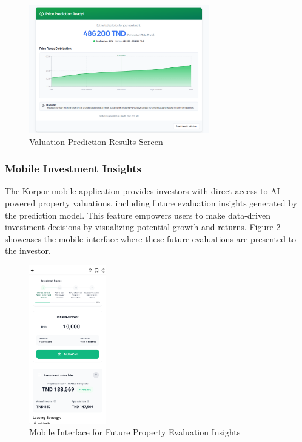 \newpage
\begin{figure}[htbp]
        \centering
        \includegraphics[width=0.7\textwidth]{images/screenshot_predctionscreen.png}
        \caption{Valuation Prediction Results Screen}
        \label{fig:prediction-results}
\end{figure}

\subsubsection{Mobile Investment Insights}
The Korpor mobile application provides investors with direct access to AI-powered property valuations, including future evaluation insights generated by the prediction model. This feature empowers users to make data-driven investment decisions by visualizing potential growth and returns. Figure \ref{fig:mobile-future-evaluation} showcases the mobile interface where these future evaluations are presented to the investor.

\begin{figure}[htbp]
    \centering
    \includegraphics[width=0.3\textwidth]{images/mobile_future_evaluation.png} %
    \caption{Mobile Interface for Future Property Evaluation Insights}
    \label{fig:mobile-future-evaluation}
\end{figure}


